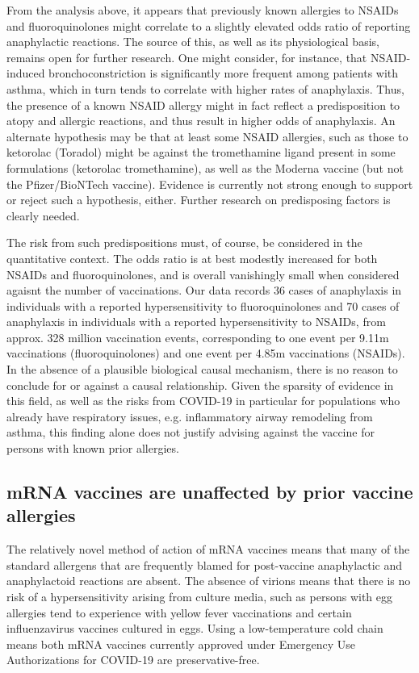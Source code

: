 \documentclass{article}
\begin{document}
From the analysis above, it appears that previously known allergies to NSAIDs and fluoroquinolones might correlate to a slightly elevated odds ratio of reporting anaphylactic reactions.
The source of this, as well as its physiological basis, remains open for further research.
One might consider, for instance, that NSAID-induced bronchoconstriction is significantly more frequent among patients with asthma,\cite{morales2015nsaid} which in turn tends to correlate with higher rates of anaphylaxis.
Thus, the presence of a known NSAID allergy might in fact reflect a predisposition to atopy and allergic reactions, and thus result in higher odds of anaphylaxis.
An alternate hypothesis may be that at least some NSAID allergies, such as those to ketorolac (Toradol) might be against the tromethamine ligand present in some formulations (ketorolac tromethamine), as well as the Moderna vaccine (but not the Pfizer/BioNTech vaccine).
Evidence is currently not strong enough to support or reject such a hypothesis, either.
Further research on predisposing factors is clearly needed.

The risk from such predispositions must, of course, be considered in the quantitative context.
The odds ratio is at best modestly increased for both NSAIDs and fluoroquinolones, and is overall vanishingly small when considered agaisnt the number of vaccinations.
Our data records 36 cases of anaphylaxis in individuals with a reported hypersensitivity to fluoroquinolones and 70 cases of anaphylaxis in individuals with a reported hypersensitivity to NSAIDs, from approx. 328 million vaccination events, corresponding to one event per 9.11m vaccinations (fluoroquinolones) and one event per 4.85m vaccinations (NSAIDs).
In the absence of a plausible biological causal mechanism, there is no reason to conclude for or against a causal relationship.
Given the sparsity of evidence in this field, as well as the risks from COVID-19 in particular for populations who already have respiratory issues, e.g. inflammatory airway remodeling from asthma, this finding alone does not justify advising against the vaccine for persons with known prior allergies.


\subsection{mRNA vaccines are unaffected by prior vaccine allergies}

The relatively novel method of action of mRNA vaccines means that many of the standard allergens that are frequently blamed for post-vaccine anaphylactic and anaphylactoid reactions are absent.
The absence of virions means that there is no risk of a hypersensitivity arising from culture media, such as persons with egg allergies tend to experience with yellow fever vaccinations and certain influenzavirus vaccines cultured in eggs.
Using a low-temperature cold chain means both mRNA vaccines currently approved under Emergency Use Authorizations for COVID-19 are preservative-free.
\end{document}
